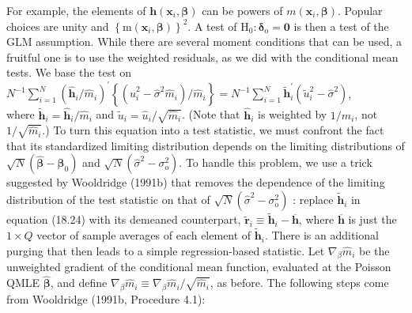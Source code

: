 \documentclass[10pt]{article}
\begin{document}
For example, the elements of $\mathbf{h}\left(\mathbf{x}_{i}, \boldsymbol{\beta}\right)$ can be powers of $m\left(\mathbf{x}_{i}, \boldsymbol{\beta}\right)$. Popular choices are unity and $\left\{\mathrm{m}\left(\mathbf{x}_{i}, \boldsymbol{\beta}\right)\right\}^{2}$. A test of $\mathrm{H}_{0}: \boldsymbol{\delta}_{\mathrm{o}}=\mathbf{0}$ is then a test of the GLM assumption. While there are several moment conditions that can be used, a fruitful one is to use the weighted residuals, as we did with the conditional mean tests. We base the test on\\
$N^{-1} \sum_{i=1}^{N}\left(\hat{\mathbf{h}}_{i} / \hat{m}_{i}\right)^{\prime}\left\{\left(\hat{u}_{i}^{2}-\hat{\sigma}^{2} \hat{m}_{i}\right) / \hat{m}_{i}\right\}=N^{-1} \sum_{i=1}^{N} \tilde{\mathbf{h}}_{i}^{\prime}\left(\tilde{u}_{i}^{2}-\hat{\sigma}^{2}\right)$,\\
where $\tilde{\mathbf{h}}_{i}=\hat{\mathbf{h}}_{i} / \hat{m}_{i}$ and $\tilde{u}_{i}=\hat{u}_{i} / \sqrt{\hat{m}_{i}}$. (Note that $\hat{\mathbf{h}}_{i}$ is weighted by $1 / \hat{m}_{i}$, not $1 / \sqrt{\hat{m}_{i}}$.) To turn this equation into a test statistic, we must confront the fact that its standardized limiting distribution depends on the limiting distributions of $\sqrt{N}\left(\hat{\boldsymbol{\beta}}-\boldsymbol{\beta}_{0}\right)$ and $\sqrt{N}\left(\hat{\sigma}^{2}-\sigma_{\mathrm{o}}^{2}\right)$. To handle this problem, we use a trick suggested by Wooldridge (1991b) that removes the dependence of the limiting distribution of the test statistic on that of $\sqrt{N}\left(\hat{\sigma}^{2}-\sigma_{\mathrm{o}}^{2}\right)$ : replace $\tilde{\mathbf{h}}_{i}$ in equation (18.24) with its demeaned counterpart, $\tilde{\mathbf{r}}_{i} \equiv \tilde{\mathbf{h}}_{i}-\overline{\mathbf{h}}$, where $\overline{\mathbf{h}}$ is just the $1 \times Q$ vector of sample averages of each element of $\tilde{\mathbf{h}}_{i}$. There is an additional purging that then leads to a simple regression-based statistic. Let $\nabla_{\beta} \hat{m}_{i}$ be the unweighted gradient of the conditional mean function, evaluated at the Poisson QMLE $\hat{\boldsymbol{\beta}}$, and define $\nabla_{\beta} \hat{m}_{i} \equiv \nabla_{\beta} \hat{m}_{i} / \sqrt{\hat{m}_{i}}$, as before. The following steps come from Wooldridge (1991b, Procedure 4.1):
\end{document}
